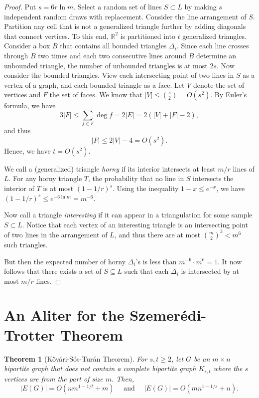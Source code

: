 \documentclass[12pt,reqno]{amsart}
\newtheorem{theorem}{Theorem}[section]
\theoremstyle{definition}
\theoremstyle{remark}
\renewcommand{\leq}{\leqslant}
\renewcommand{\geq}{\geqslant}
\def\R{\mathbb{R}}
\numberwithin{equation}{section}
\begin{document}
\begin{proof}
	Put $s = 6r\ln m$. Select a random set of lines $S \subset L$ by making $s$ independent random draws with replacement. Consider the line arrangement of $S$. Partition any cell that is not a generalized triangle further by adding diagonals that connect vertices. To this end, $\R^2$ is partitioned into $t$ generalized triangles. Consider a box $B$ that contains all bounded triangles $\Delta_i$. Since each line crosses through $B$ two times and each two consecutive lines around $B$ determine an unbounded triangle, the number of unbounded triangles is at most $2s$. Now consider the bounded triangles. View each intersecting point of two lines in $S$ as a vertex of a graph, and each bounded triangle as a face. Let $V$ denote the set of vertices and $F$ the set of faces. We know that $|V| \leq \binom{s}{2} = O(s^2)$. By Euler's formula, we have
	\[
		3|F| \leq \sum_{f \in F} \deg f = 2|E| = 2(|V| + |F| - 2),
	\]
	and thus 
	\[
		|F| \leq 2|V| - 4 = O(s^2).
	\]
	Hence, we have $t = O(s^2)$. 
	
	We call a (generalized) triangle \textit{horny} if its interior intersects at least $m/r$ lines of $L$. For any horny triangle $T$, the probability that no line in $S$ intersects the interior of $T$ is at most $(1 - 1/r)^s$. Using the inequality $1 - x \leq e^{-x}$, we have $(1 - 1/r)^s \leq e^{-6\ln m} = m^{-6}$. 

	Now call a triangle \textit{interesting} if it can appear in a triangulation for some sample $S \subset L$. Notice that each vertex of an interesting triangle is an intersecting point of two lines in the arrangement of $L$, and thus there are at most $\binom{m}{2}^3 < m^6$ such triangles. 

	But then the expected number of horny $\Delta_i$'s is less than $m^{-6} \cdot m^{6} = 1$. It now follows that there exists a set of $S \subseteq L$ such that each $\Delta_i$ is intersected by at most $m/r$ lines.
\end{proof}

\newpage

\section{An Aliter for the Szemerédi-Trotter Theorem}

\begin{theorem}[Kővári-Sós-Turán Theorem]
	For $s, t \geq 2$, let $G$ be an $m \times n$ bipartite graph that does not contain a complete bipartite graph $K_{s, t}$ where the $s$ vertices are from the part of size $m$. Then,
	\[
		|E(G)| = O(nm^{1 - 1/t} + m) \quad \text{ and } \quad |E(G)| = O(mn^{1 - 1/s} + n).
	\]
\end{theorem}
\end{document}
